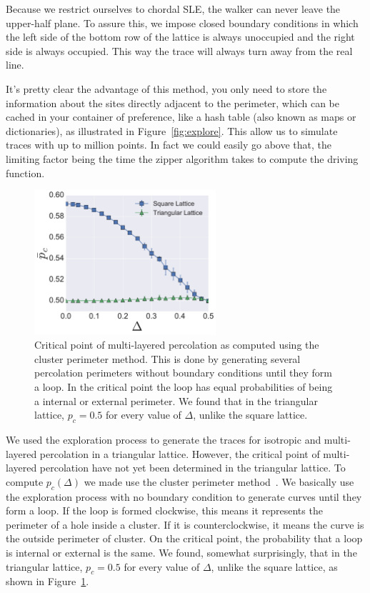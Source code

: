 Because we restrict ourselves to chordal SLE, the walker can never leave the
upper-half plane. To assure this, we impose closed boundary conditions in which
the left side of the bottom row of the lattice is always unoccupied and the
right side is always occupied. This way the trace will always turn away from
the real line.

It's pretty clear the advantage of this method, you only need to store the
information about the sites directly adjacent to the perimeter, which can be
cached in your container of preference, like a hash table (also known as maps
or dictionaries), as illustrated in Figure~\ref{fig:explore}. This allow us to
simulate traces with up to million points. In fact we could easily go above
that, the limiting factor being the time the zipper algorithm takes to compute
the driving function.

\begin{figure}[t]
\begin{center}
    \includegraphics[width=0.6\textwidth]{chapters/ch6-asle/figs/mlp_ps}
\end{center}
\caption{Critical point of multi-layered percolation as computed using the
    cluster perimeter method. This is done by generating several percolation
    perimeters without boundary conditions until they form a loop. In the
    critical point the loop has equal probabilities of being a internal or
    external perimeter. We found that in the triangular lattice, $p_c=0.5$
    for every value of $\Delta$, unlike the square lattice.}
\label{fig:mlp_ps}
\end{figure}

We used the exploration process to generate the traces for isotropic and
multi-layered percolation in a triangular lattice. However, the critical point
of multi-layered percolation have not yet been determined in the triangular
lattice. To compute $p_c(\Delta)$ we made use the cluster perimeter
method~\cite{Ziff1986}. We basically use the exploration process with no
boundary condition to generate curves until they form a loop. If the loop is
formed clockwise, this means it represents the perimeter of a hole inside a
cluster. If it is counterclockwise, it means the curve is the outside perimeter
of cluster. On the critical point, the probability that a loop is internal or
external is the same. We found, somewhat surprisingly, that in the triangular
lattice, $p_c=0.5$ for every value of $\Delta$, unlike the square lattice, as
shown in Figure~\ref{fig:mlp_ps}.

